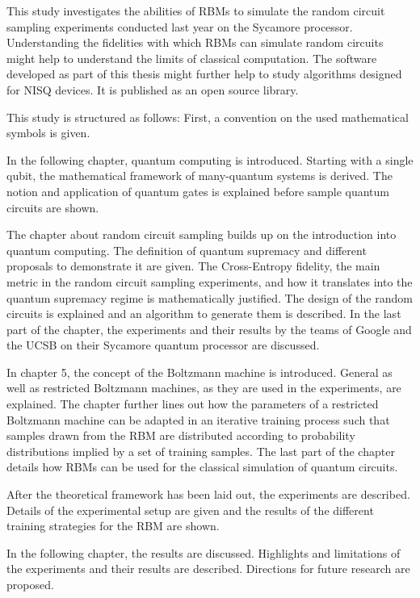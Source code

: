 This study investigates the abilities of RBMs to simulate the random circuit sampling 
experiments conducted last year on the Sycamore processor. Understanding the
fidelities with which RBMs can simulate random circuits might help to understand
the limits of classical computation. The software developed as part of this thesis 
might further help to study algorithms designed for NISQ devices. It is published as 
an open source library.

This study is structured as follows: First, a convention on the used mathematical 
symbols is given.

In the following chapter, quantum computing is introduced. Starting with a single qubit,
the mathematical framework of many-quantum systems is derived. The notion and application 
of quantum gates is explained before sample quantum circuits are shown.

The chapter about random circuit sampling builds up on the introduction into quantum computing.
The definition of quantum supremacy and different proposals to demonstrate it are given. The 
Cross-Entropy fidelity, the main metric in the random circuit sampling experiments, and how 
it translates into the quantum supremacy regime is mathematically justified. The design of 
the random circuits is explained and an algorithm to generate them is described. In the last
part of the chapter, the experiments and their results by the teams of Google and the UCSB on 
their Sycamore quantum processor are discussed.

In chapter 5, the concept of the Boltzmann machine is introduced. General as well as restricted 
Boltzmann machines, as they are used in the experiments, are explained. The chapter further 
lines out how the parameters of a restricted Boltzmann machine can be adapted in an iterative 
training process such that samples drawn from the RBM are distributed according to probability 
distributions implied by a set of training samples. The last part of the chapter details how 
RBMs can be used for the classical simulation of quantum circuits.

After the theoretical framework has been laid out, the experiments are described. Details of 
the experimental setup are given and the results of the different training strategies for the 
RBM are shown.

In the following chapter, the results are discussed. Highlights and limitations of the 
experiments and their results are described. Directions for future research are proposed.
